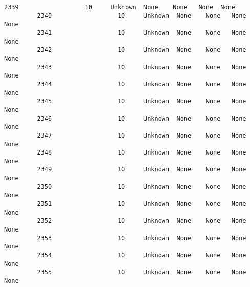 \documentclass[11pt]{article}
\begin{document}
\begin{Verbatim}[commandchars=\\\{\}]
         2339                  10     Unknown  None    None   None  None   
         2340                  10     Unknown  None    None   None  None   
         2341                  10     Unknown  None    None   None  None   
         2342                  10     Unknown  None    None   None  None   
         2343                  10     Unknown  None    None   None  None   
         2344                  10     Unknown  None    None   None  None   
         2345                  10     Unknown  None    None   None  None   
         2346                  10     Unknown  None    None   None  None   
         2347                  10     Unknown  None    None   None  None   
         2348                  10     Unknown  None    None   None  None   
         2349                  10     Unknown  None    None   None  None   
         2350                  10     Unknown  None    None   None  None   
         2351                  10     Unknown  None    None   None  None   
         2352                  10     Unknown  None    None   None  None   
         2353                  10     Unknown  None    None   None  None   
         2354                  10     Unknown  None    None   None  None   
         2355                  10     Unknown  None    None   None  None   
         

\end{Verbatim}
\end{document}
